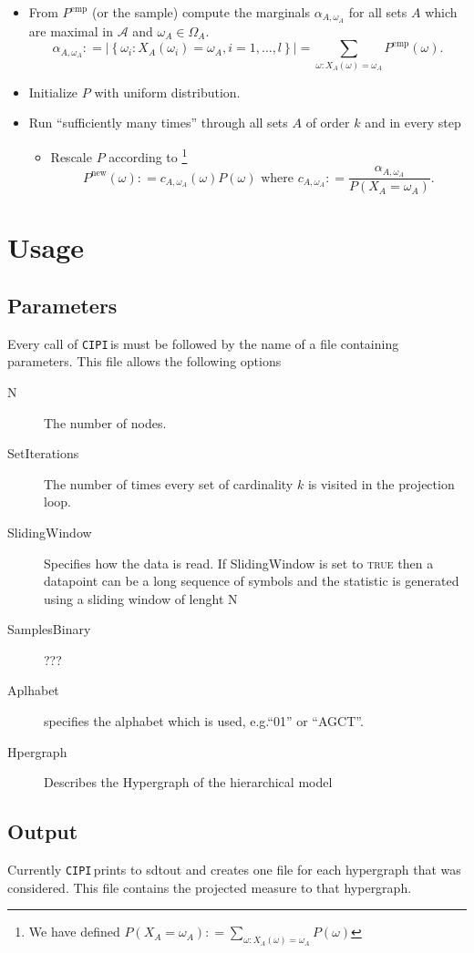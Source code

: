 \documentclass[12pt]{amsart}
\newcommand{\set}[1]{\left\lbrace #1 \right\rbrace} %
\newcommand{\defas}{\mathrel{\mathop{:}}=}   %
\providecommand{\abs}[1]{\left\lvert#1\right\rvert}
\newcommand{\eg}{e.g.\;}  %
\newcommand{\cipi}{\texttt{CIPI}\,}
\theoremstyle{plain}%
\theoremstyle{definition}
\theoremstyle{remark}
\begin{document}
\begin{itemize}
\item From $P^{\text{emp}}$ (or the sample) compute the marginals
  $\alpha_{A,\omega_A}$ for all sets $A$ which are maximal in $\mathcal{A}$ and 
  $\omega_A \in \Omega_A$.
  \begin{equation*}
    \alpha_{A,\omega_A} \defas \abs{\set{\omega_i : X_A(\omega_i)
        = \omega_A, i=1,\ldots,l}} = \sum_{\omega : X_A(\omega) = \omega_A}P^{\text{emp}}(\omega).
  \end{equation*}
\item Initialize $P$ with uniform distribution.
\item Run ``sufficiently many times'' through all sets $A$ of order
  $k$ and in every step
  \begin{itemize}
  \item Rescale $P$ according to \footnote{We have defined
      $P(X_A=\omega_A) \defas \sum_{\omega: X_A(\omega) = \omega_A}
      P(\omega)$}
    \begin{equation*}
      P^{\text{new}}(\omega) \defas c_{A,\omega_A}(\omega) P(\omega) \text{ where } c_{A,\omega_A} \defas \frac{\alpha_{A,\omega_A}}{P(X_A = \omega_A)}.
    \end{equation*}
  \end{itemize}
\end{itemize}


\section{Usage}
\label{sec:usage}
\subsection{Parameters}
Every call of \cipi is must be followed by the name of a file containing
parameters. This file allows the following options
\begin{description}
  \item[N] The number of nodes.
  \item[SetIterations] The number of times every set of cardinality $k$ is
    visited in the projection loop.
  \item[SlidingWindow] Specifies how the data is read. If SlidingWindow is set
    to \textsc{true} then a datapoint can be a long sequence of symbols and the
    statistic is generated using a sliding window of lenght N
  \item[SamplesBinary] ???
  \item[Aplhabet] specifies the alphabet which is used, \eg ``01'' or
    ``AGCT''. 
  \item[Hpergraph] Describes the Hypergraph of the hierarchical model
\end{description}

\subsection{Output}
Currently \cipi prints to sdtout and creates one file for each hypergraph that
was considered. This file contains the projected measure to that hypergraph.



\end{document}
